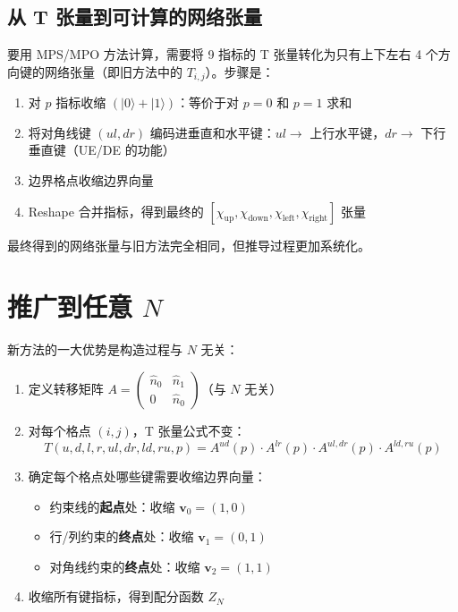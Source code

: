 \documentclass[12pt,a4paper]{article}
\begin{document}
\subsection{从 T 张量到可计算的网络张量}

要用 MPS/MPO 方法计算，需要将 9 指标的 T 张量转化为只有上下左右 4 个方向键的网络张量（即旧方法中的 $T_{i,j}$）。步骤是：
\begin{enumerate}
  \item 对 $p$ 指标收缩 $(|0\rangle + |1\rangle)$：等价于对 $p = 0$ 和 $p = 1$ 求和
  \item 将对角线键 $(ul, dr)$ 编码进垂直和水平键：$ul \to$ 上行水平键，$dr \to$ 下行垂直键（UE/DE 的功能）
  \item 边界格点收缩边界向量
  \item Reshape 合并指标，得到最终的 $[\chi_{\text{up}}, \chi_{\text{down}}, \chi_{\text{left}}, \chi_{\text{right}}]$ 张量
\end{enumerate}

最终得到的网络张量与旧方法完全相同，但推导过程更加系统化。

\section{推广到任意 $N$}

新方法的一大优势是构造过程与 $N$ 无关：

\begin{keybox}
\begin{enumerate}
  \item 定义转移矩阵 $A = \begin{pmatrix} \hat{n}_0 & \hat{n}_1 \\ 0 & \hat{n}_0 \end{pmatrix}$（与 $N$ 无关）

  \item 对每个格点 $(i,j)$，T 张量公式不变：
  \[
  T(u, d, l, r, ul, dr, ld, ru, p) = A^{ud}(p) \cdot A^{lr}(p) \cdot A^{ul,dr}(p) \cdot A^{ld,ru}(p)
  \]

  \item 确定每个格点处哪些键需要收缩边界向量：
  \begin{itemize}
    \item 约束线的\textbf{起点}处：收缩 $\mathbf{v}_0 = (1, 0)$
    \item 行/列约束的\textbf{终点}处：收缩 $\mathbf{v}_1 = (0, 1)$
    \item 对角线约束的\textbf{终点}处：收缩 $\mathbf{v}_2 = (1, 1)$
  \end{itemize}

  \item 收缩所有键指标，得到配分函数 $Z_N$
\end{enumerate}
\end{keybox}
\end{document}
